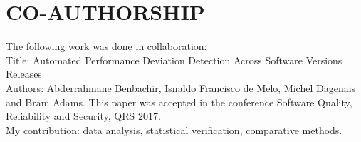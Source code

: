 
\chapter*{CO-AUTHORSHIP}\thispagestyle{headings}
%
\begin{otherlanguage}{english}

The following work was done in collaboration:\\
Title: Automated Performance Deviation Detection Across Software Versions Releases\\
Authors: Abderrahmane Benbachir, Isnaldo Francisco de Melo, Michel Dagenais and Bram Adams. This paper was accepted in the conference Software Quality, Reliability and Security, QRS 2017.\\
My contribution: data analysis, statistical verification, comparative methods.\\


\end{otherlanguage}


